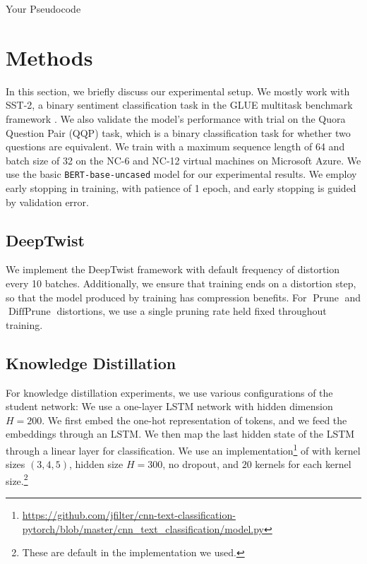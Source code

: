 \documentclass[11pt]{article}
\newcommand{\prune}{\operatorname{Prune}}
\newcommand{\diffprune}{\operatorname{DiffPrune}}
\begin{document}
\begin{algorithm}
  \begin{algorithmic}
    \STATE{}
  \end{algorithmic}
  \caption{Your Pseudocode}
\end{algorithm}




\section{Methods}
In this section, we briefly discuss our experimental setup. We mostly
work with
SST-2, a binary sentiment classification task in the GLUE multitask benchmark
framework \citep{wang2018glue}. We also validate the model's
performance with trial on the Quora Question Pair (QQP) task, which is a
binary classification task for whether two questions are equivalent. We
train with a maximum sequence length of 64 and batch size of 32 on the
NC-6 and NC-12 virtual machines on Microsoft Azure. We use the basic 
\texttt{BERT-base-uncased} model for our experimental results. We employ
early stopping in training, with patience of 1 epoch, and early stopping is
guided by validation error. 

\subsection{DeepTwist}
We implement the DeepTwist framework with default frequency of distortion
every 10 batches. Additionally, we ensure that training ends on a
distortion step, so that the model produced by training has compression
benefits. For $\prune$ and $\diffprune$ distortions, we use a single
pruning rate held fixed throughout training. 


\subsection{Knowledge Distillation}
For knowledge distillation experiments, we use various configurations of
the student network:
 We use a one-layer LSTM network with hidden dimension
$H=200$. We first embed the one-hot representation of tokens, and we feed
the embeddings through an LSTM. We then map the last hidden state of the
LSTM through a linear layer for classification. 
 We use an implementation\footnote{\url{https://github.com/jfilter/cnn-text-classification-pytorch/blob/master/cnn_text_classification/model.py}} 
of \citet{kim2014convolutional} with kernel sizes $(3,4,5)$, hidden size
$H=300$, no dropout, and $20$ kernels for each kernel size.\footnote{These
are default in the implementation we used.} 
\end{document}
